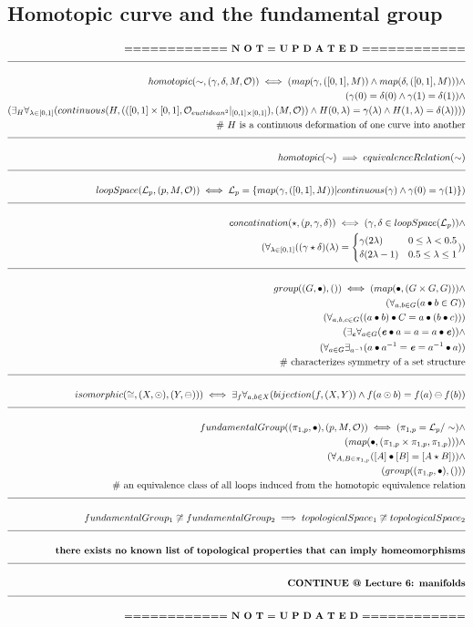 \documentclass[a4paper]{article}
\newcommand{\melazy}{\textbf{============ N O T = U P D A T E D ============}}
\newcommand{\eqComment}[1]{\text{  \# #1}}
\newcommand{\n}{\\[1.5ex] \hline \nonumber \\[0ex]}
\newcommand{\m}{\nonumber \\}
\newcommand{\field}[1]{\textbf{\textit{#1}}}
\begin{document}
\subsection{Homotopic curve and the fundamental group}
\begin{tcolorbox}
\begin{align}
   \melazy
\n homotopic(\sim, (\gamma, \delta, M, \mathcal{O})) \iff (map(\gamma, ([0, 1], M)) \land map(\delta, ([0, 1], M))) \land 
\m (\gamma(0) = \delta(0) \land \gamma(1) = \delta(1)) \land
\m (\exists_H \forall_{\lambda \in [0, 1]} (continuous(H, (([0, 1] \times [0, 1], \mathcal{O}_{euclidean^2}|_{[0, 1] \times [0, 1]}), (M, \mathcal{O})) \land H(0, \lambda) = \gamma(\lambda) \land H(1, \lambda) = \delta(\lambda))))
\m \eqComment{$H$ is a continuous deformation of one curve into another}
\n homotopic(\sim) \implies equivalenceRelation(\sim)
\n loopSpace(\mathcal{L}_p, (p, M, \mathcal{O})) \iff \mathcal{L}_p = \{map(\gamma, ([0, 1], M))| continuous(\gamma) \land \gamma(0) = \gamma(1)\})
\n concatination(\star, (p, \gamma, \delta)) \iff (\gamma, \delta \in loopSpace(\mathcal{L}_p)) \land
\m (\forall_{\lambda \in [0, 1]} ((\gamma \star \delta) (\lambda) = \begin{cases} \gamma(2 \lambda) & 0 \leq \lambda < 0.5 \\ \delta(2 \lambda - 1) & 0.5 \leq \lambda \leq 1 \end{cases}))
\n group((G, \bullet), ()) \iff (map(\bullet, (G \times G, G))) \land
\m (\forall_{a, b \in G} (a \bullet b \in G))
\m (\forall_{a, b, c \in G} ((a \bullet b) \bullet C = a \bullet (b \bullet c)))
\m (\exists_\field{e} \forall_{a \in G} (\field{e} \bullet a = a = a \bullet \field{e})) \land
\m (\forall_{a \in G} \exists_{a^{-1}} (a \bullet a^{-1} = \field{e} = a^{-1} \bullet a))
\m \eqComment{characterizes symmetry of a set structure}
\n isomorphic(\cong, (X, \odot), (Y, \ominus))) \iff \exists_f \forall_{a, b \in X} (bijection(f, (X, Y)) \land f(a \odot b) = f(a) \ominus f(b))
\n fundamentalGroup((\pi_{1, p}, \bullet), (p, M, \mathcal{O})) \iff (\pi_{1, p} = \mathcal{L}_p / \sim) \land
\m (map(\bullet, (\pi_{1, p} \times \pi_{1, p}, \pi_{1, p}))) \land
\m (\forall_{A, B \in \pi_{1, p}} ([A] \bullet [B] = [A \star B])) \land
\m (group((\pi_{1, p}, \bullet), ()))
\m \eqComment{an equivalence class of all loops induced from the homotopic equivalence relation}
\n fundamentalGroup_1 \centernot\cong fundamentalGroup_2 \implies topologicalSpace_1 \centernot\cong topologicalSpace_2
\n \textbf{there exists no known list of topological properties that can imply homeomorphisms}
\n \textbf{CONTINUE @ Lecture 6: manifolds}
\n \melazy
\end{align}
\end{tcolorbox}
\end{document}

